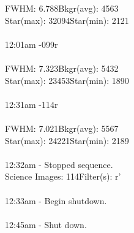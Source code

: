 \documentclass[11pt]{report}
\begin{document}
FWHM: 6.788\hspace{70pt}Bkgr(avg): 4563 \\
Star(max): 32094\hspace{55pt}Star(min): 2121\\ \\
12:01am -\hspace{97pt}099r \\ \\
FWHM: 7.323\hspace{70pt}Bkgr(avg): 5432 \\
Star(max): 23453\hspace{55pt}Star(min): 1890\\ \\
12:31am -\hspace{97pt}114r \\ \\
FWHM: 7.021\hspace{70pt}Bkgr(avg): 5567 \\
Star(max): 24221\hspace{55pt}Star(min): 2189\\ \\
12:32am - Stopped sequence. \\
Science Images: 114\hspace{97pt}Filter(s): r' \\ \\
12:33am - Begin shutdown. \\ \\
12:45am - Shut down. \\ \\
\end{document}
